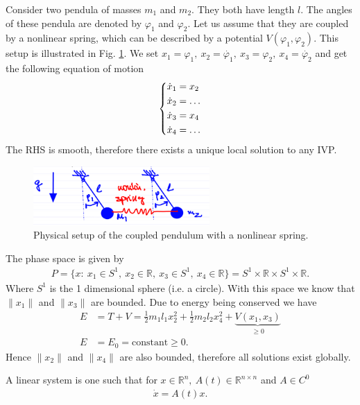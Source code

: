 \begin{ex}
	Consider two pendula of masses $m_1$ and $m_2$. They both have length $l$. The angles of these pendula are denoted by $\varphi_1$ and $\varphi_2$. Let us assume that they are coupled by a nonlinear spring, which can be described by a potential $V(\varphi_1, \varphi_2)$. This setup is illustrated in Fig. \ref{fig:coupled_pendulum}. We set $x_1 = \varphi_1,\ x_2 = \dot{\varphi_1},\ x_3 = \varphi_2,\ x_4=\dot{\varphi_2} $ and get the following equation of motion
\begin{align}
	\begin{dcases}
		\dot{x}_1 = x_2 \\ \dot{x}_2 = \ldots \\ \dot{x}_3 = x_4 \\ \dot{x}_4 = \ldots
	\end{dcases}
\end{align}
The RHS is smooth, therefore there exists a unique local solution to any IVP.
\begin{figure}[h!]
	\centering
	\includegraphics[width=0.6\textwidth]{figures/ch1/6coupled_pendulum.png}
	\caption{Physical setup of the coupled pendulum with a nonlinear spring.}
	\label{fig:coupled_pendulum}
\end{figure}
The phase space is given by 
\begin{align}
	P = \{ {x}:\ x_1 \in S^1,\ x_2 \in \mathbb{R},\ x_3 \in S^1,\ x_4 \in \mathbb{R} \} = S^1 \times \mathbb{R}\times S^1 \times \mathbb{R}.
\end{align}
Where $S^1$ is the 1 dimensional sphere (i.e. a circle). With this space we know that $ \|x_1 \|$ and $ \|x_3 \|$ are bounded. Due to energy being conserved we have
\begin{align}
	E &= T+V = \frac{1}{2}m_1 l_1 x_2^2 + \frac{1}{2}m_2 l_2 x_4^2 + \underbrace{V(x_1, x_3)}_{\geq 0}\\
	E &= E_0 =  \textrm{constant} \geq 0.
\end{align}
Hence $ \|x_2 \|$ and $ \|x_4 \|$ are also bounded, therefore all solutions exist globally.
\end{ex}
\begin{definition}
	A linear system is one such that for $ {x}\in \mathbb{R}^{n},\ {A}(t) \in \mathbb{R}^{n\times n}$ and ${A}\in C^0$ 
	\begin{align}
		\boxed{\dot{ {x}} = {A}(t)  {x}.}
	\end{align}
\end{definition}

